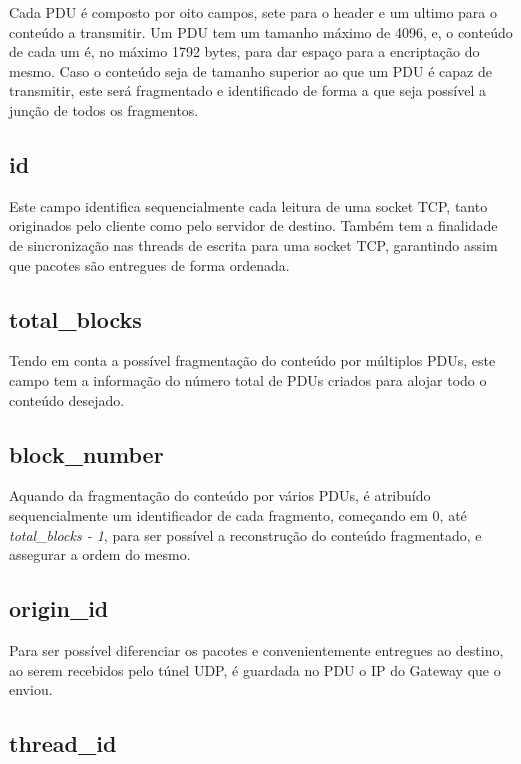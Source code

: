\documentclass[a4paper]{report}
\begin{document}
Cada PDU é composto por oito campos, sete para o header e um ultimo
para o conteúdo a transmitir. Um PDU tem um tamanho máximo de 4096,
e, o conteúdo de cada um é, no máximo 1792 bytes, para dar espaço
para a encriptação do mesmo. Caso o conteúdo seja de tamanho 
superior ao que um PDU é capaz de transmitir, este será fragmentado
e identificado de forma a que seja possível a junção de todos os
fragmentos.

\subsection{id}

Este campo identifica sequencialmente cada leitura de uma socket TCP,
tanto originados pelo cliente como pelo servidor de destino. Também 
tem a finalidade de sincronização nas threads de escrita para uma
socket TCP, garantindo assim que pacotes são entregues de forma ordenada.

\subsection{total\_blocks}

Tendo em conta a possível fragmentação do conteúdo por múltiplos PDUs,
este campo tem a informação do número total de PDUs criados para alojar
todo o conteúdo desejado.

\subsection{block\_number}

Aquando da fragmentação do conteúdo por vários PDUs, é atribuído sequencialmente
um identificador de cada fragmento, começando em 0, até \textit{total\_blocks
- 1}, para ser possível a reconstrução do conteúdo fragmentado, e assegurar
a ordem do mesmo.

\subsection{origin\_id}

Para ser possível diferenciar os pacotes e convenientemente entregues ao 
destino, ao serem recebidos pelo túnel UDP, é guardada no PDU o IP do 
Gateway que o enviou.

\subsection{thread\_id}
\end{document}

